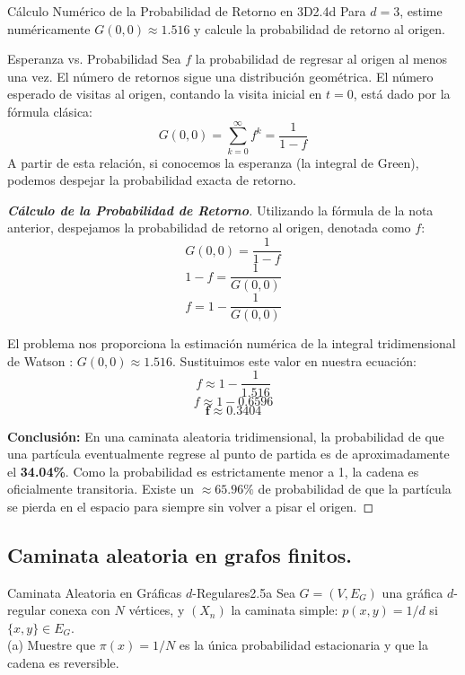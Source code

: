 \documentclass[10pt,a4paper]{article}
\begin{document}
\newpage

\begin{ejercicio}{Cálculo Numérico de la Probabilidad de Retorno en 3D}{2.4d}
    Para $d = 3$, estime numéricamente $G(0,0) \approx 1.516$ y calcule la probabilidad de retorno al origen.
\end{ejercicio}

\vspace{2mm}

\begin{nota}{Esperanza vs. Probabilidad }
    Sea $f$ la probabilidad de regresar al origen al menos una vez. El número de retornos sigue una distribución geométrica. 
    El número esperado de visitas al origen, contando la visita inicial en $t=0$, está dado por la fórmula clásica:
    \[ G(0,0) = \sum_{k=0}^{\infty} f^k = \frac{1}{1 - f} \]
    A partir de esta relación, si conocemos la esperanza (la integral de Green), podemos despejar la probabilidad exacta de retorno.
\end{nota}

\begin{proof}[\textbf{Cálculo de la Probabilidad de Retorno}]
    Utilizando la fórmula de la nota anterior, despejamos la probabilidad de retorno al origen, denotada como $f$:
    \[ G(0,0) = \frac{1}{1 - f} \]
    \[ 1 - f = \frac{1}{G(0,0)} \]
    \[ f = 1 - \frac{1}{G(0,0)} \]
    
    El problema nos proporciona la estimación numérica de la integral tridimensional de Watson
    : $G(0,0) \approx 1.516$.
    Sustituimos este valor en nuestra ecuación:
    \[ f \approx 1 - \frac{1}{1.516} \]
    \[ f \approx 1 - 0.6596 \]
    \[ \mathbf{f \approx 0.3404} \]
    
    \textbf{Conclusión:} 
    En una caminata aleatoria tridimensional, la probabilidad de que una partícula eventualmente regrese al punto de partida es de aproximadamente el \textbf{34.04\%}. 
    Como la probabilidad es estrictamente menor a 1, la cadena es oficialmente transitoria. Existe un $\approx 65.96\%$ de probabilidad de que la partícula se pierda en el espacio para siempre sin volver a pisar el origen.
\end{proof}

\newpage
\subsection{Caminata aleatoria en grafos finitos.}
\vspace{5mm}

\begin{ejercicio}{Caminata Aleatoria en Gráficas $d$-Regulares}{2.5a}
    Sea $G = (V,E_G)$ una gráfica $d$-regular conexa con $N$ vértices, y $(X_n)$ la caminata simple: $p(x,y) = 1/d$ si $\{x,y\} \in E_G$. \\
    (a) Muestre que $\pi(x) = 1/N$ es la única probabilidad estacionaria y que la cadena es reversible.
\end{ejercicio}
\end{document}
